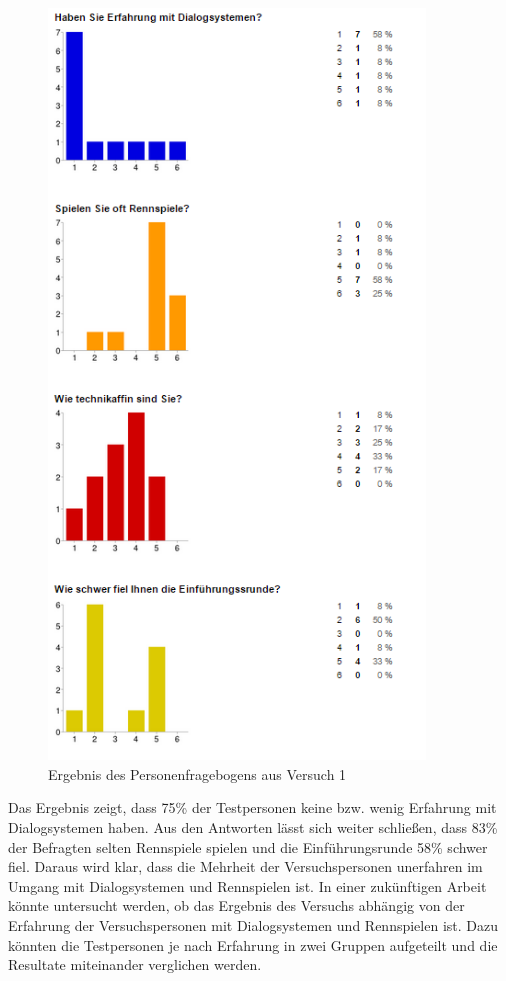 \documentclass[12pt,a4paper]{scrartcl}
\begin{document}
\begin{figure}[H]
\begin{center}
\includegraphics[width=10cm]{person1.png}
\caption{Ergebnis des Personenfragebogens aus Versuch 1}
\label{fbpersonaus}
\end{center}
\end{figure}
\newpage

Das Ergebnis zeigt, dass 75\% der Testpersonen keine bzw. wenig Erfahrung mit Dialogsystemen haben. Aus den Antworten lässt sich weiter schließen, dass 83\% der Befragten selten Rennspiele spielen und die Einführungsrunde 58\% schwer fiel. Daraus wird klar, dass die Mehrheit der Versuchspersonen unerfahren im Umgang mit Dialogsystemen und Rennspielen ist. In einer zukünftigen Arbeit könnte untersucht werden, ob das Ergebnis des Versuchs abhängig von der Erfahrung der Versuchspersonen mit Dialogsystemen und Rennspielen ist. Dazu könnten die Testpersonen je nach Erfahrung in zwei Gruppen aufgeteilt und die Resultate miteinander verglichen werden. 
\end{document}
